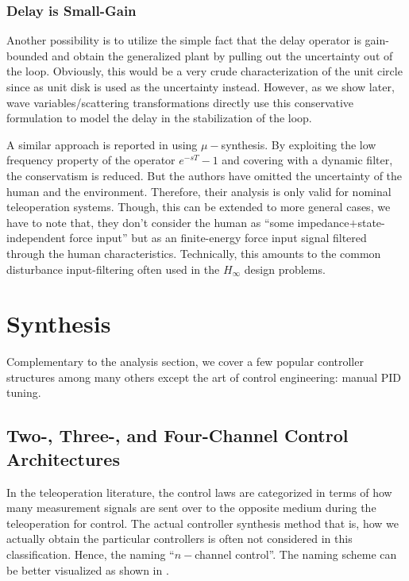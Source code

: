 \subsubsection{Delay is Small-Gain}
Another possibility is to utilize the simple fact that the delay operator is gain-bounded and obtain the 
generalized plant by pulling out the uncertainty out of the loop. Obviously, this would be a very crude
characterization of the unit circle since as unit disk is used as the uncertainty instead. However, as 
we show later, wave variables/scattering transformations directly use this conservative formulation to 
model the delay in the stabilization of the loop.

A similar approach is reported in \cite{leungfa} using $\mu-$synthesis. By exploiting the
low frequency property of the operator $e^{-sT}-1$ and covering with a dynamic filter, the conservatism
is reduced. But the authors have omitted the uncertainty of the human and the environment. Therefore, 
their analysis is only valid for nominal teleoperation systems. Though, this can be extended to more 
general cases, we have to note that, they don't consider the human as ``some impedance$+$state-independent 
force input'' but as an finite-energy force input signal filtered through the human characteristics. 
Technically, this amounts to the common disturbance input-filtering often used in the $H_\infty$ design problems. 

 




\section{Synthesis}

Complementary to the analysis section, we cover a few popular controller structures among many others except the 
art of control engineering: manual PID tuning. 

\subsection{Two-, Three-, and Four-Channel Control Architectures}
In the teleoperation literature, the control laws are categorized in terms of how many measurement signals 
are sent over to the opposite medium during the teleoperation for control. The actual controller synthesis method
that is, how we actually obtain the particular controllers is often not considered in this classification.  Hence, the naming 
``$n-$channel control''. The naming scheme can be better visualized as shown in . 


